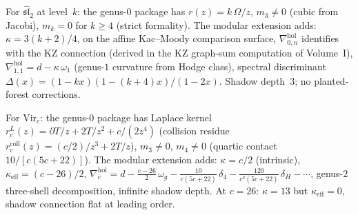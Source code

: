 \begin{computation}
\label{comp:vol2-affine-modular-extension}
For $\widehat{\mathfrak{sl}}_2$ at level~$k$: the genus-$0$
package has $r(z)=k\,\Omega/z$, $m_3\neq 0$ (cubic from Jacobi),
$m_k=0$ for $k\ge 4$ (strict formality).
The modular extension adds:
$\kappa=3(k+2)/4$,
on the affine Kac--Moody comparison surface,
$\nabla^{\mathrm{hol}}_{0,n}$ identifies with the KZ connection
(derived in the KZ graph-sum computation of Volume~I),
$\nabla^{\mathrm{hol}}_{1,1}=d-\kappa\,\omega_1$
(genus-$1$ curvature from Hodge class),
spectral discriminant
$\Delta(x)=(1-kx)(1-(k{+}4)x)/(1-2x)$.
Shadow depth~$3$; no planted-forest corrections.
\end{computation}

\begin{computation}
\label{comp:vol2-virasoro-modular-extension}
For $\mathrm{Vir}_c$: the genus-$0$ package has
Laplace kernel $r^L_c(z)=\partial T/z+2T/z^2+c/(2z^4)$
(collision residue $r^{\mathrm{coll}}_c(z)=(c/2)/z^3+2T/z$),
$m_3\neq 0$, $m_4\neq 0$
(quartic contact $10/[c(5c+22)]$).
The modular extension adds:
$\kappa=c/2$ (intrinsic), $\kappa_{\mathrm{eff}}=(c-26)/2$,
$\nabla^{\mathrm{hol}}_c
=d-\frac{c-26}{2}\,\omega_g
-\frac{10}{c(5c+22)}\,\delta_4
-\frac{120}{c^2(5c+22)}\,\delta_H-\cdots$,
genus-$2$ three-shell decomposition, infinite shadow depth.
At $c=26$: $\kappa=13$ but $\kappa_{\mathrm{eff}}=0$, shadow
connection flat at leading order.
\end{computation}

